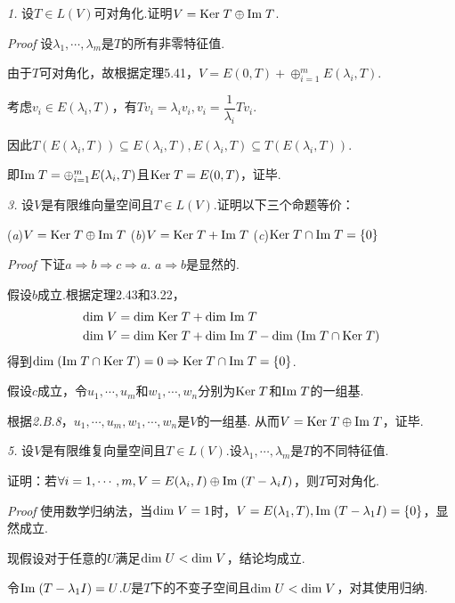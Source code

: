 \textit{1.}
设\(T \in L(V)\)可对角化.证明\(V=\mathrm{Ker \;} T \oplus \mathrm{Im \;} T\).

\textit{Proof}
设\(\lambda_1,\cdots,\lambda_m\)是\(T\)的所有非零特征值.

由于\(T\)可对角化，故根据定理5.41，\(V=E(0,T)+\oplus_{i=1}^m E(\lambda_i,T)\).

考虑\(v_i \in E(\lambda_i,T)\)，有\(Tv_i=\lambda_iv_i,v_i=\dfrac{1}{\lambda_i}Tv_i\).

因此\(T(E(\lambda_i,T)) \subseteq E(\lambda_i,T),E(\lambda_i,T) \subseteq T(E(\lambda_i,T))\).

即\(\mathrm{Im \;} T=\oplus_{i=1}^m E(\lambda_i,T)\)且\(\mathrm{Ker \;} T=E(0,T)\)，证毕.

\hspace*{\fill}

\textit{3.}
设\(V\)是有限维向量空间且\(T \in L(V)\).证明以下三个命题等价：

(\textit{a})\(V=\mathrm{Ker \;} T \oplus \mathrm{Im \;} T\) \quad
(\textit{b})\(V=\mathrm{Ker \;} T+\mathrm{Im \;} T\) \quad
(\textit{c})\(\mathrm{Ker \;} T \cap \mathrm{Im \;} T=\{0\}\)

\textit{Proof}
下证\(a \Rightarrow b \Rightarrow c \Rightarrow a\).
\(a \Rightarrow b\)是显然的.

假设\(b\)成立.根据定理2.43和3.22，
    \begin{align*}
        \mathrm{dim \;} V &= \mathrm{dim \;} \mathrm{Ker \;} T+\mathrm{dim \;} \mathrm{Im \;} T \\
        \mathrm{dim \;} V &= \mathrm{dim \;} \mathrm{Ker \;} T+\mathrm{dim \;} \mathrm{Im \;} T-\mathrm{dim \;} (\mathrm{Im \;} T \cap \mathrm{Ker \;} T)
    \end{align*}
得到\(\mathrm{dim \;} (\mathrm{Im \;} T \cap \mathrm{Ker \;} T)=0 \Rightarrow \mathrm{Ker \;} T \cap \mathrm{Im \;} T=\{0\}\).

假设\(c\)成立，令\(u_1,\cdots,u_m\)和\(w_1,\cdots,w_n\)分别为\(\mathrm{Ker \;} T\)和\(\mathrm{Im \;} T\)的一组基.

根据\textit{2.B.8}，\(u_1,\cdots,u_m,w_1,\cdots,w_n\)是\(V\)的一组基.
从而\(V=\mathrm{Ker \;} T \oplus \mathrm{Im \;} T\)，证毕.

\hspace*{\fill}

\textit{5.}
设\(V\)是有限维复向量空间且\(T \in L(V)\).设\(\lambda_1,\cdots,\lambda_m\)是\(T\)的不同特征值.

证明：若\(\forall i=1,\cdots,m,V=E(\lambda_i,I) \oplus \mathrm{Im \;}(T-\lambda_i I)\)，则\(T\)可对角化.

\textit{Proof}
使用数学归纳法，当\(\mathrm{dim \;} V=1\)时，\(V=E(\lambda_1,T),\mathrm{Im \;}(T-\lambda_1 I)=\{0\}\)，显然成立.

现假设对于任意的\(U\)满足\(\mathrm{dim \;} U<\mathrm{dim \;} V\)，结论均成立.

令\(\mathrm{Im \;}(T-\lambda_1 I)=U\).\(U\)是\(T\)下的不变子空间且\(\mathrm{dim \;} U<\mathrm{dim \;} V\)，对其使用归纳.

